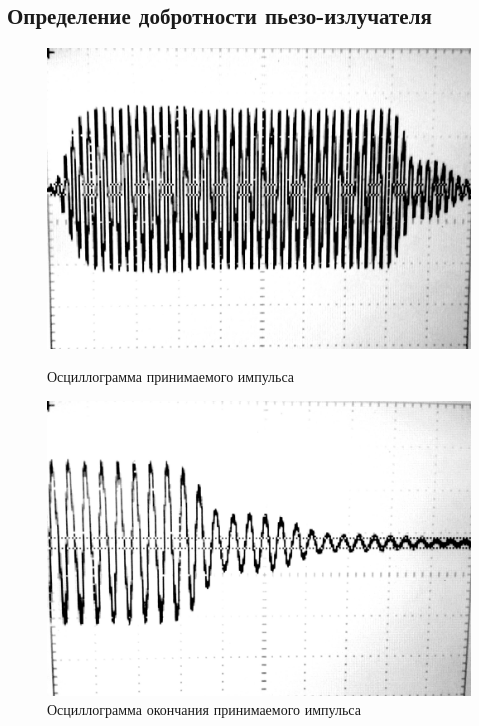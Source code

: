 \subsection{Определение добротности пьезо-излучателя}

\begin{figure}[h!]
	\centering
	\begin{minipage}{0.49\linewidth}
		\includegraphics[width =\linewidth]{fig/Q/1.jpg}
		\caption{Осциллограмма принимаемого импульса}
		\label{fig:Q1}
	\end{minipage}
	\begin{minipage}{0.49\linewidth}
		\includegraphics[width =\linewidth]{fig/Q/3.jpg}
		\caption{Осциллограмма окончания принимаемого импульса}
		\label{fig:Q2}
	\end{minipage}
\end{figure}
